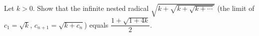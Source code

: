 Let $k>0$. Show that the infinite nested radical $\sqrt{k+\sqrt{k+\sqrt{k+\cdots}}}$ (the limit of $c_1=\sqrt k$, $c_{n+1}=\sqrt{k+c_n}$) equals $\dfrac{1+\sqrt{1+4k}}{2}$.
